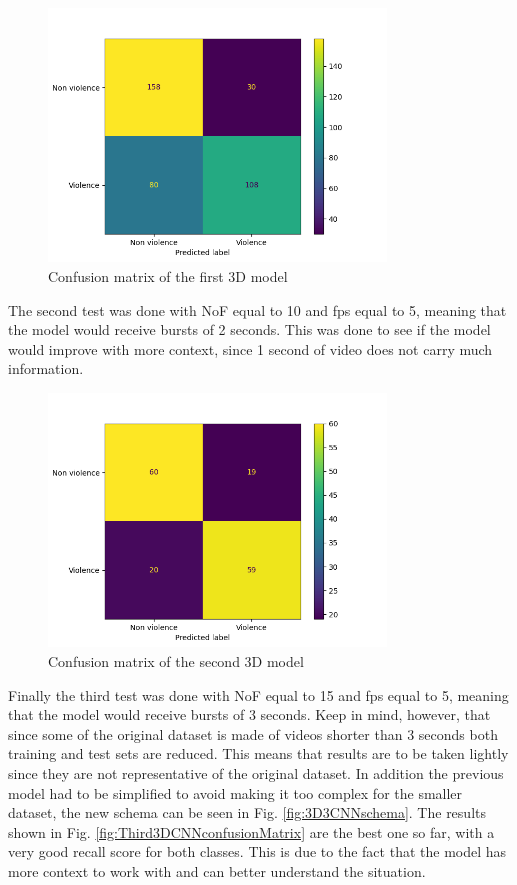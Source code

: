 \begin{figure}[]
    \centering
    \includegraphics[width=0.8\textwidth]{images/7f2d-testGiacomo3D9-9fcf-conf_matrix.png}
    \caption{Confusion matrix of the first 3D model}
    \label{fig:First3DCNNconfusionMatrix}
\end{figure}

The second test was done with NoF equal to 10 and fps equal to 5, meaning that the model would receive bursts of 2 seconds. This was done to see if the model would improve with more context, since 1 second of video does not carry much information. 

\begin{figure}[]
    \centering
    \includegraphics[width=0.8\textwidth]{images/ce07-testGiacomo3D3-9fcf-conf_matrix.png}
    \caption{Confusion matrix of the second 3D model}
    \label{fig:Second3DCNNconfusionMatrix}
\end{figure}

Finally the third test was done with NoF equal to 15 and fps equal to 5, meaning that the model would receive bursts of 3 seconds. Keep in mind, however, that since some of the original dataset is made of videos shorter than 3 seconds both training and test sets are reduced. This means that results are to be taken lightly since they are not representative of the original dataset. In addition the previous model had to be simplified to avoid making it too complex for the smaller dataset, the new schema can be seen in Fig. \ref{fig:3D3CNNschema}. The results shown in Fig. \ref{fig:Third3DCNNconfusionMatrix} are the best one so far, with a very good recall score for both classes. This is due to the fact that the model has more context to work with and can better understand the situation.

